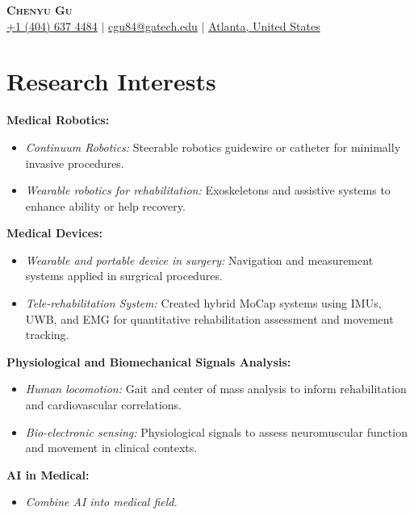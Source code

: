 \documentclass[letterpaper,11pt]{article}
\newcommand{\resumeItem}[1]{
  \item\small{
    {#1 \vspace{-2pt}}
  }
}
\newcommand{\resumeItemListStart}{\begin{itemize}}
\newcommand{\resumeItemListEnd}{\end{itemize}\vspace{-5pt}}
\begin{document}
\begin{center}
  \textbf{\Huge \scshape Chenyu Gu} \\ \vspace{3pt}
  \small
  \faMobile \hspace{.5pt} \href{tel:14046374484}{+1 (404) 637 4484}
  $|$
  \faAt \hspace{.5pt} \href{mailto:cgu84@gatech.edu}{cgu84@gatech.edu}
  $|$
  \faMapMarker \hspace{.5pt} \href{https://www.google.com/maps/place/Georgia+Institute+of+Technology/@33.7756222,-84.3988599,16z/data=!3m1!4b1}{Atlanta, United States}
\end{center}
\section{Research Interests}
\vspace{2pt}
{\textbf{Medical Robotics:}
\vspace{-5pt}
\resumeItemListStart
  \resumeItem{\textit{Continuum Robotics:} Steerable robotics guidewire or catheter for minimally invasive procedures.}
  \vspace{-3pt}
  \resumeItem{\textit{Wearable robotics for rehabilitation:} Exoskeletons and assistive systems to enhance ability or help recovery.}
\resumeItemListEnd}
{\textbf{Medical Devices:}
\vspace{-5pt}
\resumeItemListStart
  \resumeItem{\textit{Wearable and portable device in surgery:} Navigation and measurement systems applied in surgrical procedures.}
    \vspace{-3pt}
  \resumeItem{\textit{Tele-rehabilitation System:} Created hybrid MoCap systems using IMUs, UWB, and EMG for quantitative rehabilitation assessment and movement tracking.}
\resumeItemListEnd}
{\textbf{Physiological and Biomechanical Signals Analysis:}
\vspace{-5pt}
\resumeItemListStart
  \resumeItem{\textit{Human locomotion:} Gait and center of mass analysis to inform rehabilitation and cardiovascular correlations.}
  \vspace{-3pt}
  \resumeItem{\textit{Bio-electronic sensing:} Physiological signals to assess neuromuscular function and movement in clinical contexts.}
\resumeItemListEnd}
{\textbf{AI in Medical:}
\vspace{-5pt}
\resumeItemListStart
  \resumeItem{\textit{Combine AI into medical field.}}
\resumeItemListEnd}
\end{document}
